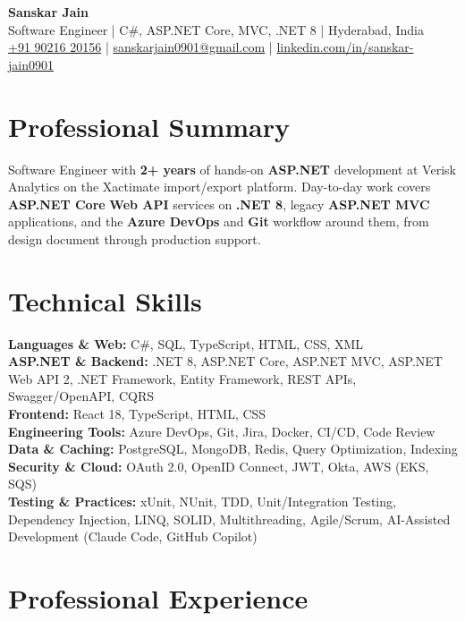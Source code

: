 \documentclass[a4paper,10pt]{article}
\begin{document}
\begin{center}
    {\LARGE \textbf{Sanskar Jain}} \\
    \vspace{2pt}
    Software Engineer \;|\; C\#, ASP.NET Core, MVC, .NET 8 \;|\; Hyderabad, India \\
    \href{tel:+919021620156}{+91 90216 20156} \;|\;
    \href{mailto:sanskarjain0901@gmail.com}{sanskarjain0901@gmail.com} \;|\;
    \href{https://www.linkedin.com/in/sanskar-jain0901/}{linkedin.com/in/sanskar-jain0901}
\end{center}

\section*{Professional Summary}
Software Engineer with \textbf{2+ years} of hands-on \textbf{ASP.NET} development at Verisk Analytics on the Xactimate import/export platform. Day-to-day work covers \textbf{ASP.NET Core} \textbf{Web API} services on \textbf{.NET 8}, legacy \textbf{ASP.NET MVC} applications, and the \textbf{Azure DevOps} and \textbf{Git} workflow around them, from design document through production support.

\section*{Technical Skills}
\begin{sloppypar}
\noindent
\textbf{Languages \& Web:} C\#, SQL, TypeScript, HTML, CSS, XML \\
\textbf{ASP.NET \& Backend:} .NET 8, ASP.NET Core, ASP.NET MVC, ASP.NET Web API 2, .NET Framework, Entity Framework, REST APIs, Swagger/OpenAPI, CQRS \\
\textbf{Frontend:} React 18, TypeScript, HTML, CSS \\
\textbf{Engineering Tools:} Azure DevOps, Git, Jira, Docker, CI/CD, Code Review \\
\textbf{Data \& Caching:} PostgreSQL, MongoDB, Redis, Query Optimization, Indexing \\
\textbf{Security \& Cloud:} OAuth 2.0, OpenID Connect, JWT, Okta, AWS (EKS, SQS) \\
\textbf{Testing \& Practices:} xUnit, NUnit, TDD, Unit/Integration Testing, Dependency Injection, LINQ, SOLID, Multithreading, Agile/Scrum, AI-Assisted Development (Claude Code, GitHub Copilot)
\end{sloppypar}

\section*{Professional Experience}
\end{document}
